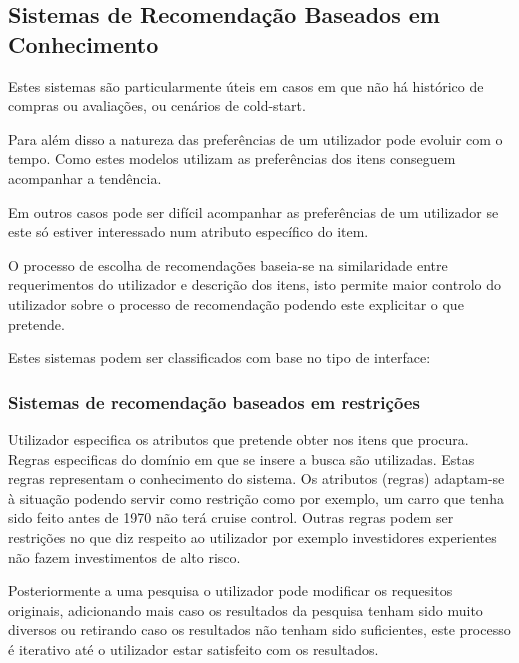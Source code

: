 \subsection{Sistemas de Recomendação Baseados em Conhecimento}
\hfill
\par Estes sistemas são particularmente úteis em casos em que não há histórico de compras ou avaliações, ou cenários de cold-start.
\par Para além disso a natureza das preferências de um utilizador pode evoluir com o tempo. Como estes modelos utilizam as preferências dos itens conseguem acompanhar a tendência. 
\par Em outros casos pode ser difícil acompanhar as preferências de um utilizador se este só estiver interessado num atributo específico do item.
\par O processo de escolha de recomendações baseia-se na similaridade entre requerimentos do utilizador e descrição dos itens, isto permite maior controlo do utilizador sobre o processo de recomendação podendo este explicitar o que pretende.
\par Estes sistemas podem ser classificados com base no tipo de interface:
\hfill
\subsubsection{Sistemas de recomendação baseados em restrições}
\hfill
 \par Utilizador especifica os atributos que pretende obter nos itens que procura. Regras especificas do domínio em que se insere a busca são utilizadas. Estas regras representam o conhecimento do sistema. Os atributos (regras) adaptam-se à situação podendo servir como restrição como por exemplo, um carro que tenha sido feito  antes de 1970 não terá cruise control. Outras regras podem ser restrições no que diz respeito ao utilizador por exemplo investidores experientes não fazem investimentos de alto risco. 
 \par Posteriormente a uma pesquisa o utilizador pode modificar os requesitos originais, adicionando mais caso os resultados da pesquisa tenham sido muito diversos ou retirando caso os resultados não tenham sido suficientes, este processo é iterativo até o utilizador estar satisfeito com os resultados.  

\hfill
